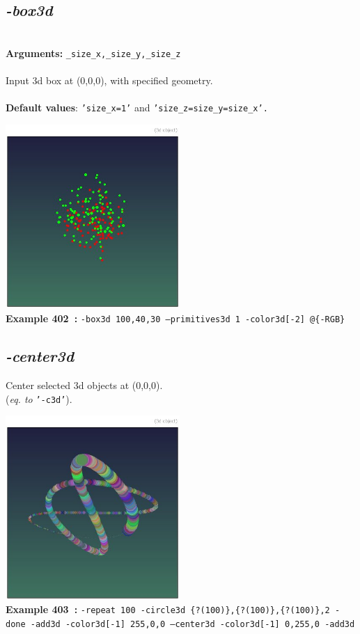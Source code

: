 \documentclass[a4paper,11pt,twoside]{book}
\begin{document}
\subsection{\emph{-box3d} }\vspace*{-0.5em}
~\\\textbf{Arguments: } 
{\small \texttt{\_size\_x,\_size\_y,\_size\_z}}\\~\\
Input 3d box at (0,0,0), with specified geometry.
~\\~\\\textbf{Default values}: {\small \texttt{'size\_x=1'} and \texttt{'size\_z=size\_y=size\_x'.}}
\begin{center}\includegraphics[keepaspectratio=true,height=7cm,width=\textwidth]{img/gmic_def402.jpg}\\
{\footnotesize \textbf{Example 402~:} \texttt{-box3d 100,40,30 --primitives3d 1 -color3d[-2] @\{-RGB\}}}
\end{center}

\subsection{\emph{-center3d} }\vspace*{-0.5em}
Center selected 3d objects at (0,0,0).
~\\(\emph{eq. to} {\small \texttt{'-c3d'}}).
\begin{center}\includegraphics[keepaspectratio=true,height=7cm,width=\textwidth]{img/gmic_def403.jpg}\\
{\footnotesize \textbf{Example 403~:} \texttt{-repeat 100 -circle3d \{?(100)\},\{?(100)\},\{?(100)\},2 -done -add3d -color3d[-1] 255,0,0 --center3d -color3d[-1] 0,255,0 -add3d}}
\end{center}
\end{document}
